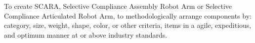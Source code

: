 To create SCARA, Selective Compliance Assembly Robot Arm or Selective Compliance Articulated Robot Arm, to methodologically arrange components by: category, size, weight, shape, color, or other criteria, items in a agile, expeditious, and optimum manner at or above industry standards. 
